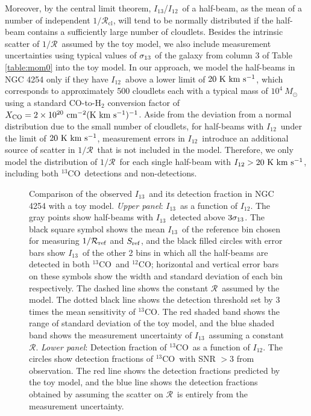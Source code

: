 \documentclass{emulateapj}
\def\ttco{\mbox{$^{13}$CO}}
\def\twco{\mbox{$^{12}$CO}}
\def\rtt{$\mathcal{R}$}
\def\itw{$I_{12}$}
\def\itt{$I_{13}$}
\begin{document}
Moreover, by the central limit theorem,  
\itt/\itw \ of a half-beam, as the mean of a number of 
independent $1/$\rtt$_{\mathrm{cl}}$,  
will tend to be normally distributed if the half-beam contains 
a sufficiently large number of cloudlets. 
Besides the intrinsic scatter of $1/$\rtt \ assumed by the toy model, we also include measurement uncertainties using typical values of $\sigma_{\rm 13}$ of the galaxy from column 3 of Table \ref{table:mom0} into the toy model.
In our approach, we model the half-beams in NGC 4254 only if they
have \itw \ above a lower limit of $20 \rm \  K \ km \ s^{-1}$, 
which corresponds to approximately 500 cloudlets each 
with a typical mass of $10^4 \ M_{\odot}$ using a standard CO-to-H$_{2}$ conversion factor of 
$X_{\rm CO} = 2 \times 10^{20} \ \mathrm{cm^{-2} (K \ km
  \ s^{-1})^{-1}}$.      
Aside from the deviation from a normal distribution due to the small  
number of cloudlets,  
for half-beams with \itw \ under the limit of 
$20 \rm\  K \ km \ s^{-1}$, 
measurement errors in \itw \  introduce
an additional source of scatter in $1/$\rtt \  that is not included in the model.  
Therefore, we only model the distribution of $1/$\rtt \ 
for each single half-beam with $I_{12} > 20 \rm \  K \ km \ s^{-1}$, 
including both \ttco \ detections and non-detections.  

\begin{figure*}
\caption{
Comparison of the observed \itt \ and its detection fraction in NGC 4254  with a toy model. 
\textit{Upper panel}: \itt \ as a function of $I_{\mathrm 12}$. 
The gray points show half-beams with \itt \ detected 
above $3\sigma_{\rm 13}$.  
The black square symbol shows the mean \itt \ of the reference bin chosen for measuring $1/\mathcal{R}_{\rm ref}$ and $S_{\rm ref}$, and the black filled circles with error bars show \itt \ of the other 2 bins in which all the half-beams are detected in both \ttco \ and \twco; horizontal and vertical error bars on these symbols show the width and standard deviation of each bin respectively.   
The dashed line shows the constant \rtt \ assumed by the model.
The dotted black line shows the detection
threshold set by 3 times the mean sensitivity of \ttco.  
The red shaded band shows the range of standard deviation of the toy model, and the blue shaded band shows the measurement uncertainty of \itt \ assuming a constant \rtt. 
\textit{Lower panel}: Detection fraction of \ttco \ as a
function of  $I_{\mathrm  12}$. 
The circles show detection fractions of \ttco \ with SNR $>3$ from observation. 
The red line shows the detection fractions
predicted by the toy model, and the blue line shows the detection fractions obtained by assuming the scatter on \rtt \ is entirely from the measurement uncertainty.}
\label{fig:mdr}
\end{figure*}
\end{document}
